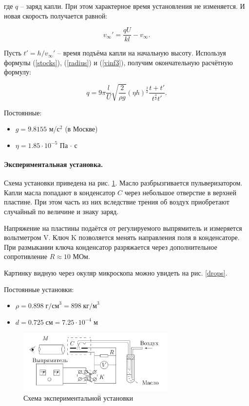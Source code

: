 \documentclass[a4paper,12pt]{article} %
\begin{document}
\noindent где $q$ -- заряд капли. При этом характерное время установления не изменяется. И новая скорость получается равной:

\begin{equation}
v_\infty' = \frac{qU}{kl} - v_\infty. \label{vinf3}
\end{equation}

Пусть $t' = h / v_\infty'$ -- время подъёма капли на начальную высоту. Используя формулы (\ref{stocks}), (\ref{radius}) и (\ref{vinf3}), получим окончательную расчётную формулу:

\begin{equation}
q = 9 \pi \frac{l}{U} \sqrt{\frac{2}{\rho g}} (\eta h)^{\frac{3}{2}} \frac{t + t'}{t^\frac{3}{2} t'}. \label{final}
\end{equation}

Постоянные:

\begin{itemize}
\item $g = 9.8155$ м/с$^2$ (в Москве)
\item $\eta = 1.85 \cdot 10^{-5}$ Па $\cdot$ с
\end{itemize}

\paragraph{Экспериментальная установка.} Схема установки приведена на рис. \ref{setup}. Масло разбрызгивается пульверизатором. Капли масла попадают в конденсатор $C$ через небольшое отверстие в верхней пластине. При этом часть из них вследствие трения об воздух приобретают случайный по величине и знаку заряд.

Напряжение на пластины подаётся от регулируемого выпрямитель и измеряется вольтметром V. Ключ K позволяется менять направления поля в конденсаторе. При размыкании ключа конденсатор разряжается через дополнительное сопротивление $R \approx 10$ МОм.

Картинку видную через окуляр микроскопа можно увидеть на рис. \ref{drops}.


Постоянные установки:
\begin{itemize}
\item $\rho = 0.898 \; \text{г/см}^3 = 898 \; \text{кг/м}^3$
\item $d = 0.725 \; \text{см} = 7.25 \cdot 10^{-4} \; \text{м}$
\end{itemize}

\begin{figure}[h]
\centering
\includegraphics[width=0.7\textwidth]{setup.png}
\caption{Схема экспериментальной установки}
\label{setup}
\end{figure}
\end{document}
